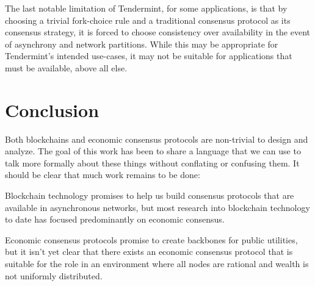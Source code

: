 \documentclass[11pt,a4paper]{article}
\theoremstyle{plain}
\theoremstyle{definition}
\begin{document}
The last notable limitation of Tendermint, for some applications, is that by choosing a trivial fork-choice rule and a traditional consensus protocol as its consensus strategy, it is forced to choose consistency over availability in the event of asynchrony and network partitions. While this may be appropriate for Tendermint's intended use-cases, it may not be suitable for applications that must be available, above all else. 


\section{Conclusion}

Both blockchains and economic consensus protocols are non-trivial to design and analyze. The goal of this work has been to share a language that we can use to talk more formally about these things without conflating or confusing them. It should be clear that much work remains to be done: 

Blockchain technology promises to help us build consensus protocols that are available in asynchronous networks, but most research into blockchain technology to date has focused predominantly on economic consensus.

Economic consensus protocols promise to create backbones for public utilities, but it isn't yet clear that there exists an economic consensus protocol that is suitable for the role in an environment where all nodes are rational and wealth is not uniformly distributed.

\pagebreak


\end{document}

